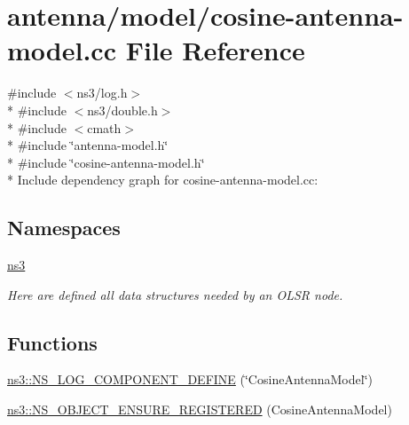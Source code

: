 \hypertarget{cosine-antenna-model_8cc}{}\section{antenna/model/cosine-\/antenna-\/model.cc File Reference}
\label{cosine-antenna-model_8cc}
{\ttfamily \#include $<$ns3/log.\+h$>$}\\*
{\ttfamily \#include $<$ns3/double.\+h$>$}\\*
{\ttfamily \#include $<$cmath$>$}\\*
{\ttfamily \#include \char`\"{}antenna-\/model.\+h\char`\"{}}\\*
{\ttfamily \#include \char`\"{}cosine-\/antenna-\/model.\+h\char`\"{}}\\*
Include dependency graph for cosine-\/antenna-\/model.cc\+:
\subsection*{Namespaces}
\begin{DoxyCompactItemize}
\item 
 \hyperlink{namespacens3}{ns3}
\begin{DoxyCompactList}\small\item\em Here are defined all data structures needed by an O\+L\+SR node. \end{DoxyCompactList}\end{DoxyCompactItemize}
\subsection*{Functions}
\begin{DoxyCompactItemize}
\item 
\hyperlink{namespacens3_a47695f14efbde21630188559fc418bf3}{ns3\+::\+N\+S\+\_\+\+L\+O\+G\+\_\+\+C\+O\+M\+P\+O\+N\+E\+N\+T\+\_\+\+D\+E\+F\+I\+NE} (\char`\"{}Cosine\+Antenna\+Model\char`\"{})
\item 
\hyperlink{namespacens3_ae029bb276be6b51b2ab4d885b25ac5e6}{ns3\+::\+N\+S\+\_\+\+O\+B\+J\+E\+C\+T\+\_\+\+E\+N\+S\+U\+R\+E\+\_\+\+R\+E\+G\+I\+S\+T\+E\+R\+ED} (Cosine\+Antenna\+Model)
\end{DoxyCompactItemize}
